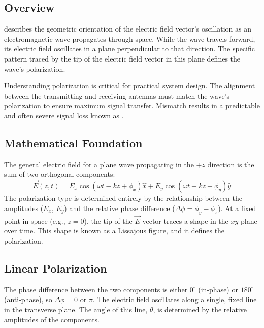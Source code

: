 \subsection{Overview}

 describes the geometric orientation of the electric field vector's oscillation as an electromagnetic wave propagates through space. While the wave travels forward, its electric field oscillates in a plane perpendicular to that direction. The specific pattern traced by the tip of the electric field vector in this plane defines the wave's polarization.

\begin{keyconcept}
    Understanding polarization is critical for practical system design. The alignment between the transmitting and receiving antennas must match the wave's polarization to ensure maximum signal transfer. Mismatch results in a predictable and often severe signal loss known as .
\end{keyconcept}


\subsection{Mathematical Foundation}

The general electric field for a plane wave propagating in the $+z$ direction is the sum of two orthogonal components:
\begin{equation}
    \vec{E}(z,t) = E_x \cos(\omega t - kz + \phi_x)\hat{x} + E_y \cos(\omega t - kz + \phi_y)\hat{y}
    \label{eq:general-efield}
\end{equation}
The polarization type is determined entirely by the relationship between the amplitudes ($E_x$, $E_y$) and the relative phase difference ($\Delta\phi = \phi_y - \phi_x$). At a fixed point in space (e.g., $z=0$), the tip of the $\vec{E}$ vector traces a shape in the $xy$-plane over time. This shape is known as a Lissajous figure, and it defines the polarization.


\subsection{Linear Polarization}

 The phase difference between the two components is either $0^\circ$ (in-phase) or $180^\circ$ (anti-phase), so $\Delta\phi = 0$ or $\pi$.
 The electric field oscillates along a single, fixed line in the transverse plane. The angle of this line, $\theta$, is determined by the relative amplitudes of the components.

